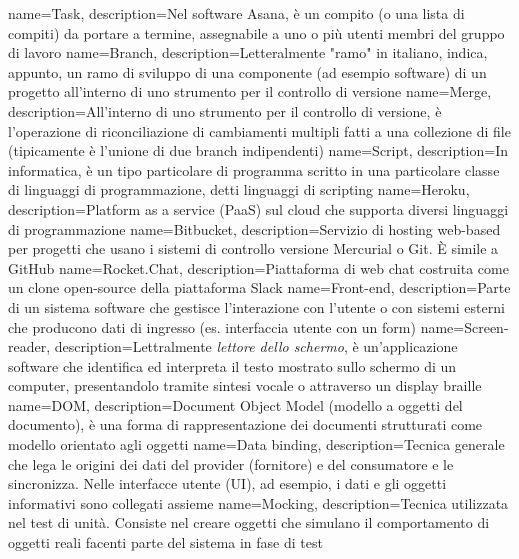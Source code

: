  {
	name=Task,
	description={Nel software Asana, è un compito (o una lista di compiti) da portare a termine,
	assegnabile a uno o più utenti membri del gruppo di lavoro}
}
 {
	name=Branch,
	description={Letteralmente "ramo" in italiano, indica, appunto, un ramo di sviluppo di una
	componente (ad esempio software) di un progetto all'interno di uno strumento per il controllo
	di versione}
}
 {
	name=Merge,
	description={All'interno di uno strumento per il controllo di versione, è l'operazione di
	riconciliazione di cambiamenti multipli fatti a una collezione di file (tipicamente è
	l'unione di due branch indipendenti)}
}
 {
	name=Script,
	description={In informatica, è un tipo particolare di programma scritto in una particolare
	classe di linguaggi di programmazione, detti linguaggi di scripting}
}
 {
	name=Heroku,
	description={Platform as a service (PaaS) sul cloud che supporta diversi linguaggi di
	programmazione}
}
 {
	name=Bitbucket,
	description={Servizio di hosting web-based per progetti che usano i sistemi di controllo
	versione Mercurial o Git. È simile a GitHub}
}
 {
	name=Rocket.Chat,
	description={Piattaforma di web chat costruita come un clone open-source della piattaforma
	Slack}
}
 {
	name=Front-end,
	description={Parte di un sistema software che gestisce l'interazione con l'utente o con
	sistemi esterni che producono dati di ingresso (es. interfaccia utente con un form)}
}
 {
	name=Screen-reader,
	description={Lettralmente \textit{lettore dello schermo}, è un'applicazione software che
	identifica ed interpreta il testo mostrato sullo schermo di un computer, presentandolo tramite
	sintesi vocale o attraverso un display braille}
}
 {
	name=DOM,
	description={Document Object Model (modello a oggetti del documento), è una forma di
	rappresentazione dei documenti strutturati come modello orientato agli oggetti}
}
 {
	name=Data binding,
	description={Tecnica generale che lega le origini dei dati del provider (fornitore) e
	del consumatore e le sincronizza. Nelle interfacce utente (UI), ad esempio, i dati
	e gli oggetti informativi sono collegati assieme}
}
 {
	name=Mocking,
	description={Tecnica utilizzata nel test di unità. Consiste nel creare oggetti che
	simulano il comportamento di oggetti reali facenti parte del sistema in fase di test}
}
